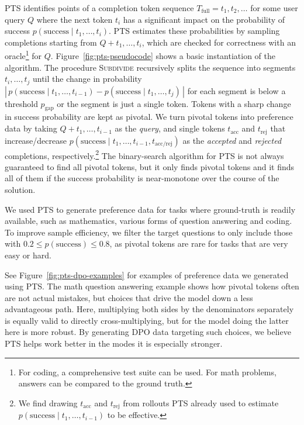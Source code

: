 PTS identifies points of a completion token sequence $T_\mathrm{full}=t_1,t_2,\dotsc$ for some user query $Q$ where the next token $t_i$ has a significant impact on the probability of success $p(\mathrm{success} \mid t_1,\dotsc,t_i)$.
PTS estimates these probabilities by sampling completions starting from $Q+t_1,\dotsc,t_i$, which are checked for correctness with an oracle\footnote{For coding, a comprehensive test suite can be used. For math problems, answers can be compared to the ground truth.} for $Q$. Figure~\ref{fig:pts-pseudocode} shows a basic instantiation of the algorithm. The procedure \textsc{Subdivide} recursively splits the sequence into segments $t_i,\dotsc,t_j$ until the change in probability $\left|\,p(\mathrm{success} \mid t_1,\dotsc,t_{i-1}) - p(\mathrm{success} \mid t_1,\dotsc,t_j)\,\right|$ for each segment is below a threshold $p_{\mathrm{gap}}$ or the segment is just a single token. Tokens with a sharp change in success probability are kept as pivotal.
We turn pivotal tokens into preference data by taking $Q + t_1,\dotsc,t_{i-1}$ as the \emph{query}, and single tokens $t_{\mathrm{acc}}$ and $t_{\mathrm{rej}}$ that increase/decrease $p(\mathrm{success} \mid t_1,\dotsc,t_{i-1}, t_{\mathrm{acc/rej}})$ as the \emph{accepted} and \emph{rejected} completions, respectively.\footnote{We find drawing $t_{\mathrm{acc}}$ and $t_{\mathrm{rej}}$ from rollouts PTS already used to estimate $p(\mathrm{success} \mid t_1,\dotsc,t_{i-1})$ to be effective.}  The binary-search algorithm for PTS is not always guaranteed to find all pivotal tokens, but it only finds pivotal tokens and it finds all of them if the success probability is near-monotone over the course of the solution.

We used PTS to generate preference data for tasks where ground-truth is readily available, such as mathematics, various forms of question answering and coding.
To improve sample efficiency, we filter the target questions to only include those with $0.2 \leq p(\mathrm{success}) \leq 0.8$, as pivotal tokens are rare for tasks that are very easy or hard.

See Figure~\ref{fig:pts-dpo-examples} for examples of preference data we generated using PTS. The math question answering example shows how pivotal tokens often are not actual mistakes, but choices that drive the model down a less advantageous path. Here, multiplying both sides by the denominators separately is equally valid to directly cross-multiplying, but for the model doing the latter here is more robust. By generating DPO data targeting such choices, we believe PTS helps \model work better in the modes it is especially stronger.


